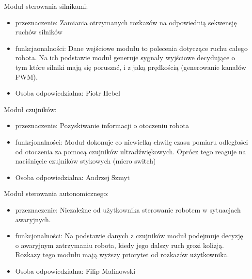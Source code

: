 \documentclass[a4paper]{article}
\begin{document}
Moduł sterowania silnikami:
\begin{itemize}
\item przeznaczenie: Zamiania otrzymanych rozkazów na odpowiednią sekwensję ruchów silników
\item funkcjaonalności: Dane wejściowe modułu to polecenia dotyczące ruchu całego robota. Na ich podstawie moduł generuje sygnały wyjściowe decydujące o tym które silniki mają się poruszać, i z jaką prędkością (generowanie kanałów PWM).
\item Osoba odpowiedzialna: Piotr Hebel
\end{itemize}
\newpage
Moduł czujników:
\begin{itemize}
\item przeznaczenie: Pozyskiwanie informacji o otoczeniu robota
\item funkcjonalności: Moduł dokonuje co niewielką chwilę czasu pomiaru odległości od otoczenia za pomocą czujników ultradźwiękowych. Oprócz tego reaguje na naciśnięcie czujników stykowych (micro switch)
\item Osoba odpowiedzialna: Andrzej Szmyt
\end{itemize}

Moduł sterowania autonomicznego:
\begin{itemize}
\item przeznaczenie: Niezależne od użytkownika sterowanie robotem w sytuacjach awaryjnych. 
\item funkcjonalności: Na podstawie danych z czujników moduł podejmuje decyzję o awaryjnym zatrzymaniu robota, kiedy jego dalszy ruch grozi kolizją. Rozkazy tego modułu mają wyższy priorytet od rozkazów użytkownika.
\item Osoba odpowiedzialna: Filip Malinowski
\end{itemize}

\end{document}

